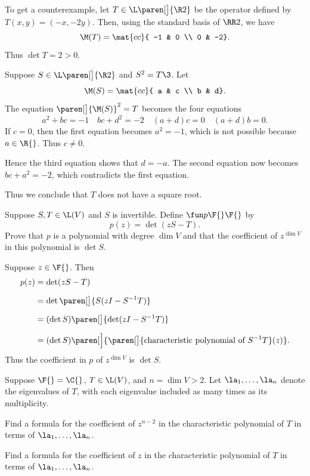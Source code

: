 \begin{Solution}
To get a counterexample, let $T \in \L\paren[\big]{\R2}$ be the operator defined by $T(x, y) = (-x, -2y)$. Then, using the standard basis of $\RR2$, we have
\[
\M(T) = \mat{cc}{
-1 & 0 \\
0 & -2}.
\]
Thus $\det T = 2 > 0$.

Suppose $S \in \L\paren[\big]{\R2}$ and $S^2 = T\3$. Let
\[
\M(S) = \mat{cc}{
a & c \\
b & d}.
\]
The equation $\paren[\big]{\M(S)}^2 = T$ becomes the four equations
\[
a^2 + bc = -1 \quad bc + d^2 = -2 \quad (a+d)c = 0 \quad (a+d) b = 0.
\]
If $c = 0$, then the first equation becomes $a^2 = -1$, which is not possible because $a \in \R{}$. Thus $c \ne 0$.

Hence the third equation shows that $d = -a$. The second equation now becomes $bc + a^2 = -2$, which contradicts the first equation.

Thus we conclude that $T$ does not have a square root.
\end{Solution}

\exercise
Suppose $S, T \in \L(V)$ and $S$ is invertible. Define $\fun p {\F{}} {\F{}}$ by
\[
p(z) = \det(zS - T).
\]
Prove that $p$ is a polynomial with degree $\dim V$ and that the coefficient of $z^{\dim V}$ in this polynomial is $\det S$.

\begin{Solution}
Suppose $z \in \F{}$. Then
\begin{align*}
p(z) &= \det(zS - T) \\[6bp]
&= \det \paren[\big]{ S(zI - S^{-1} T) }\\[6bp]
&= (\det S) \paren[\big]{ \det( zI - S^{-1}T) } \\[6bp]
&= (\det S)\paren[\Big]{ \paren[\big]{ \text{characteristic polynomial of } S^{-1} T }(z) }.
\end{align*}
Thus the coefficient in $p$ of $z^{\dim V}$ is $\det S$.
\end{Solution}

\exercise
Suppose $\F{} = \C{}$, $T \in \L(V)$, and $n = \dim V > 2$. Let $\la_1, \ldots, \la_n$ denote the eigenvalues of $T$, with each eigenvalue included as many times as its multiplicity.
\begin{subtheorem}
\item
Find a formula for the coefficient of $z^{n-2}$ in the characteristic polynomial of $T$ in terms of
$\la_1, \ldots, \la_n$.
\item
Find a formula for the coefficient of $z$ in the characteristic polynomial of $T$ in terms of
$\la_1, \ldots, \la_n$.
\end{subtheorem}

